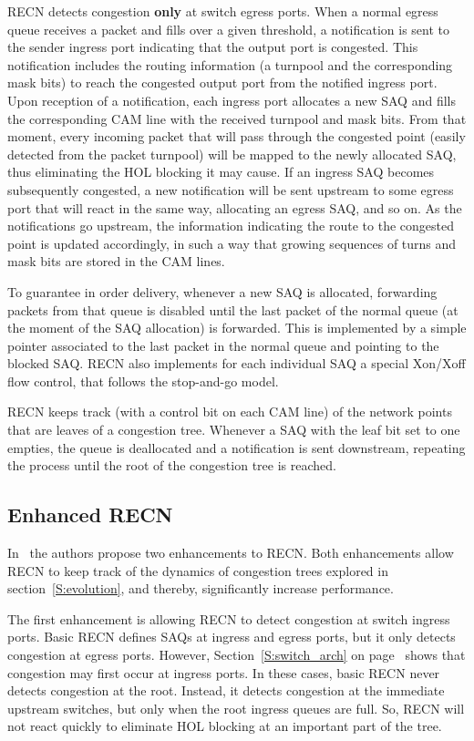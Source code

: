 RECN detects congestion \textbf{only} at switch egress ports. When a normal egress queue receives a packet and fills over a given threshold, a notification is sent to the sender ingress port indicating that the output port is congested. This notification includes the routing information (a turnpool and the corresponding mask bits) to reach the congested output port from the notified ingress port. Upon reception of a notification, each ingress port allocates a new SAQ and fills the corresponding CAM line with the received turnpool and mask bits. From that moment, every incoming packet that will pass through the congested point (easily detected from the packet turnpool) will be mapped to the newly allocated SAQ, thus eliminating the HOL blocking it may cause. If an ingress SAQ becomes subsequently congested, a new notification will be sent upstream to some egress port that will react in the same way, allocating an egress SAQ, and so on. As the notifications go upstream, the information indicating the route to the congested point is updated accordingly, in such a way that growing sequences of turns and mask bits are stored in the CAM lines. 

To guarantee in order delivery, whenever a new SAQ is allocated, forwarding packets from that queue is disabled until the last packet of the normal queue (at the moment of the SAQ allocation) is forwarded. This is implemented by a simple pointer associated to the last packet in the normal queue and pointing to the blocked SAQ. RECN also implements for each individual SAQ a special Xon/Xoff flow control, that follows the stop-and-go model. 

RECN keeps track (with a control bit on each CAM line) of the network points that are leaves of a congestion tree. Whenever a SAQ with the leaf bit set to one empties, the queue is deallocated and a notification is sent downstream, repeating the process until the root of the congestion tree is reached. 

\subsection{Enhanced RECN}\label{S:enhancedrecn}

In~\cite{paper2} the authors propose two enhancements to RECN. Both enhancements allow RECN to keep track of the dynamics of congestion trees explored in section~\ref{S:evolution}, and thereby, significantly increase performance.

The first enhancement is allowing RECN to detect congestion at switch ingress ports. Basic RECN defines SAQs at ingress and egress ports, but it only detects congestion at egress ports. However, Section~\ref{S:switch_arch} on page~\pageref{S:switch_arch} shows that congestion may first occur at ingress ports. In these cases, basic RECN never detects congestion at the root. Instead, it detects congestion at the immediate upstream switches, but only when the root ingress queues are full. So, RECN will not react quickly to eliminate HOL blocking at an important part of the tree. 

